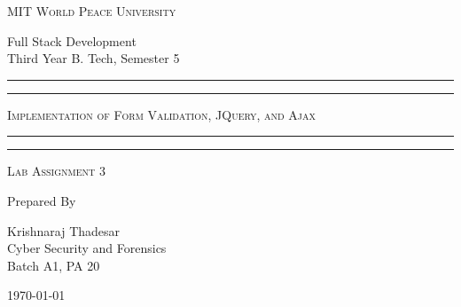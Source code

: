 \documentclass[11pt]{article}
\begin{document}
\begin{titlepage}
    \centering


    \huge\textsc{
        MIT World Peace University
    }\\

    \vspace{0.75\baselineskip} %

    \LARGE{
        Full Stack Development\\
        Third Year B. Tech, Semester 5
    }

    \vfill %


    \rule{\textwidth}{1.6pt}\vspace*{-\baselineskip}\vspace*{2pt}
    \rule{\textwidth}{0.6pt}
    \vspace{0.75\baselineskip} %



    \huge{\textsc{
            Implementation of Form Validation, JQuery, and Ajax
        }} \\



    \vspace{0.5\baselineskip} %
    \rule{\textwidth}{0.6pt}\vspace*{-\baselineskip}\vspace*{2.8pt}
    \rule{\textwidth}{1.6pt}

    \vspace{1\baselineskip} %


    \LARGE\textsc{
        Lab Assignment 3
    } %
    \vfill


    Prepared By
    \vspace{0.5\baselineskip} %

    \Large{
        Krishnaraj Thadesar \\
        Cyber Security and Forensics\\
        Batch A1, PA 20
    }


    \vspace{0.5\baselineskip} %
    \today

\end{titlepage}
\end{document}
